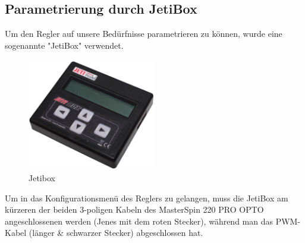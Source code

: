 \subsection{Parametrierung durch JetiBox}
Um den Regler auf unsere Bedürfnisse parametrieren zu können, wurde eine sogenannte "JetiBox" verwendet.
\begin{figure}[h]
    \centering
    \includegraphics[width=0.5\textwidth]{Fotos/JetiBox.png}
    \caption{Jetibox}
\end{figure}
\newpage
Um in das Konfigurationsmenü des Reglers zu gelangen, muss die JetiBox am kürzeren der beiden 3-poligen Kabeln des MasterSpin 220 PRO OPTO angeschlossenen werden (Jenes mit dem roten Stecker), 
während man das PWM-Kabel (länger \& schwarzer Stecker) abgeschlossen hat.\\

